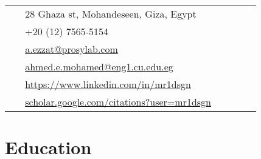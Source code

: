 \documentclass[10pt]{article} %
\begin{document}
\begin{paracol}{2}
\parbox[top][0.12\textheight][c]{\linewidth}{ %
	\vspace{-0.04\textheight} %
	\colorbox{shade}{ %
		\begin{supertabular}{p{0.05\linewidth}|p{0.775\linewidth}} %
			\raisebox{-1pt}{\faHome} & 28 Ghaza st, Mohandeseen, Giza, Egypt \\ %
			\raisebox{-1pt}{\faPhone} & +20 (12) 7565-5154 \\ %
			\raisebox{0pt}{\small\faEnvelope} & \href{mailto:a.ezzat@prosylab.com}{a.ezzat@prosylab.com} \\ %
			\raisebox{0pt}{\small\faEnvelope} & \href{ahmed.e.mohamed@eng1.cu.edu.eg}{ahmed.e.mohamed@eng1.cu.edu.eg} \\ %
			\raisebox{-1pt}{\small\faDesktop} & \href{https://www.linkedin.com/in/mr1dsgn/}{https://www.linkedin.com/in/mr1dsgn} \\ %
			\raisebox{-1pt}{\small\faDesktop} & \href{https://scholar.google.com/citations?user=mr1dsgn}{scholar.google.com/citations?user=mr1dsgn} \\ %

		\end{supertabular}
	}
}


\section{Education} 




\end{paracol}
\end{document}
